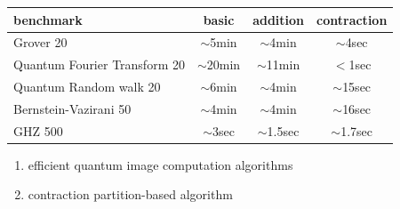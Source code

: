 \documentclass[aspectratio=1610,18pt]{ctexbeamer}
\begin{document}
\begin{frame}
  \begin{table}[]
    \Large
    \rule{0pt}{30pt}
    \begin{tabular}{l|ccc}
    benchmark & basic & addition& contraction \\\hline
    Grover 20       & $\sim$5min  & $\sim$4min & $\sim$4sec  \\
    Quantum Fourier Transform 20           & $\sim$20min & $\sim$11min & $<$1sec \\
    Quantum Random walk 20           & $\sim$6min & $\sim$4min & $\sim$15sec\\
    Bernstein-Vazirani 50           & $\sim$4min & $\sim$4min & $\sim$16sec \\
    GHZ 500         & $\sim$3sec & $\sim$1.5sec & $\sim$1.7sec\\
    \end{tabular}
    \end{table}
\end{frame}
\begin{frame}
  \begin{table}[]
    \centering
    \Large
    \end{table}
\end{frame}
\begin{frame}
  \begin{enumerate}
    \Large
    \item efficient quantum image computation algorithms
    \item contraction partition-based algorithm
  \end{enumerate}
\end{frame}
\end{document}
